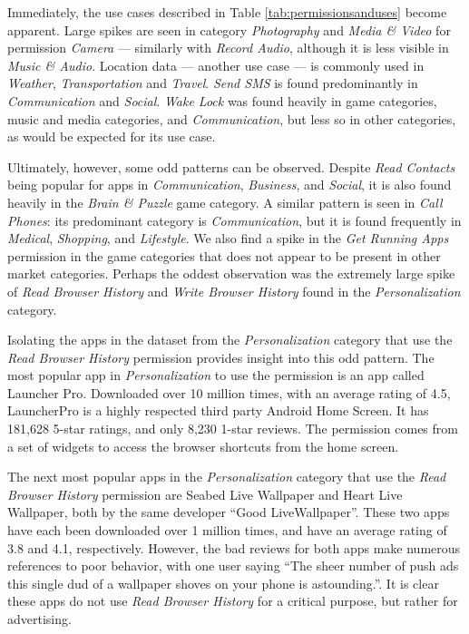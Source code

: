 Immediately, the use cases described in Table \ref{tab:permissionsanduses} become apparent. Large spikes are seen in category \textit{Photography} and \textit{Media \& Video} for permission \textit{Camera} --- similarly with \textit{Record Audio}, although it is less visible in \textit{Music \& Audio}. Location data --- another use case --- is commonly used in \textit{Weather}, \textit{Transportation} and \textit{Travel}. \textit{Send SMS} is found predominantly in \textit{Communication} and \textit{Social}. \textit{Wake Lock} was found heavily in game categories, music and media categories, and \textit{Communication}, but less so in other categories, as would be expected for its use case.

Ultimately, however, some odd patterns can be observed. Despite \textit{Read Contacts} being popular for apps in \textit{Communication}, \textit{Business}, and \textit{Social}, it is also found heavily in the \textit{Brain \& Puzzle} game category. A similar pattern is seen in \textit{Call Phones}: its predominant category is \textit{Communication}, but it is found frequently in \textit{Medical}, \textit{Shopping}, and \textit{Lifestyle}. We also find a spike in the \textit{Get Running Apps} permission in the game categories that does not appear to be present in other market categories. Perhaps the oddest observation was the extremely large spike of \textit{Read Browser History} and \textit{Write Browser History} found in the \textit{Personalization} category.

Isolating the apps in the dataset from the \textit{Personalization} category that use the \textit{Read Browser History} permission provides insight into this odd pattern. The most popular app in \textit{Personalization} to use the permission is an app called Launcher Pro\citep{launcherpro}. Downloaded over 10 million times, with an average rating of 4.5, LauncherPro is a highly respected third party Android Home Screen. It has 181,628 5-star ratings, and only 8,230 1-star reviews. The permission comes from a set of widgets to access the browser shortcuts from the home screen.

\begin{sloppypar}
The next most popular apps in the \textit{Personalization} category that use the \textit{Read Browser History} permission are Seabed Live Wallpaper\citep{seabedlivewallpaper} and Heart Live Wallpaper\citep{heartlivewallpaper}, both by the same developer ``Good LiveWallpaper''\citep{goodlivewallpaper}. These two apps have each been downloaded over 1 million times, and have an average rating of 3.8 and 4.1, respectively. However, the bad reviews for both apps make numerous references to poor behavior, with one user saying ``The sheer number of push ads this single dud of a wallpaper shoves on your phone is astounding.''\citep{seabedlivewallpaper}. It is clear these apps do not use \textit{Read Browser History} for a critical purpose, but rather for advertising.
\end{sloppypar}

